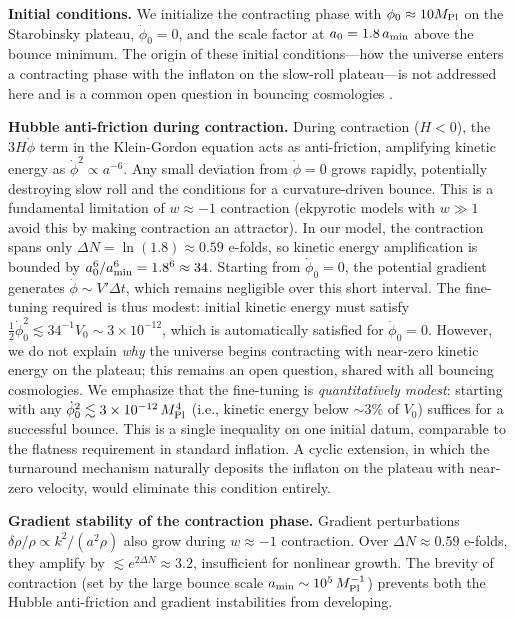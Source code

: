 \documentclass[11pt,a4paper]{article}
\begin{document}
\begin{assumption_box}
\textbf{Initial conditions.} We initialize the contracting phase with $\phi_0 \approx 10 M_{\rm Pl}$ on the Starobinsky plateau, $\dot\phi_0 = 0$, and the scale factor at $a_0 = 1.8\,a_{\rm min}$ above the bounce minimum. The origin of these initial conditions---how the universe enters a contracting phase with the inflaton on the slow-roll plateau---is not addressed here and is a common open question in bouncing cosmologies \cite{Novello2008}.

\textbf{Hubble anti-friction during contraction.} During contraction ($H < 0$), the $3H\dot\phi$ term in the Klein-Gordon equation acts as anti-friction, amplifying kinetic energy as $\dot\phi^2 \propto a^{-6}$. Any small deviation from $\dot\phi = 0$ grows rapidly, potentially destroying slow roll and the conditions for a curvature-driven bounce. This is a fundamental limitation of $w \approx -1$ contraction (ekpyrotic models with $w \gg 1$ avoid this by making contraction an attractor). In our model, the contraction spans only $\Delta N = \ln(1.8) \approx 0.59$ e-folds, so kinetic energy amplification is bounded by $a_0^6/a_{\rm min}^6 = 1.8^6 \approx 34$. Starting from $\dot\phi_0 = 0$, the potential gradient generates $\dot\phi \sim V'\Delta t$, which remains negligible over this short interval. The fine-tuning required is thus modest: initial kinetic energy must satisfy $\frac{1}{2}\dot\phi_0^2 \lesssim 34^{-1} V_0 \sim 3 \times 10^{-12}$, which is automatically satisfied for $\dot\phi_0 = 0$. However, we do not explain \emph{why} the universe begins contracting with near-zero kinetic energy on the plateau; this remains an open question, shared with all bouncing cosmologies. We emphasize that the fine-tuning is \emph{quantitatively modest}: starting with any $\dot\phi_0^2 \lesssim 3 \times 10^{-12}\,M_{\rm Pl}^4$ (i.e., kinetic energy below $\sim 3\%$ of $V_0$) suffices for a successful bounce. This is a single inequality on one initial datum, comparable to the flatness requirement in standard inflation. A cyclic extension, in which the turnaround mechanism naturally deposits the inflaton on the plateau with near-zero velocity, would eliminate this condition entirely.

\textbf{Gradient stability of the contraction phase.} Gradient perturbations $\delta\rho/\rho \propto k^2/(a^2\rho)$ also grow during $w \approx -1$ contraction. Over $\Delta N \approx 0.59$ e-folds, they amplify by $\lesssim e^{2\Delta N} \approx 3.2$, insufficient for nonlinear growth. The brevity of contraction (set by the large bounce scale $a_{\rm min} \sim 10^5\,M_{\rm Pl}^{-1}$) prevents both the Hubble anti-friction and gradient instabilities from developing.
\end{assumption_box}
\end{document}
